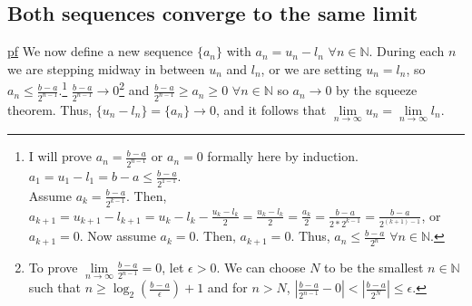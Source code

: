 \documentclass[11pt]{article} %
\begin{document}
	\subsection{Both sequences converge to the same limit}
	\underline{pf} We now define a new sequence $\{ a_n \}$ with $a_n = u_n - l_n$ $\forall n \in \mathbb{N}$. During each $n$ we are stepping midway in between $u_n$ and $l_n$, or we are setting $u_n = l_n$, so $a_n \leq \frac{b - a}{2^{n-1}}$.\footnote{I will prove $a_n = \frac{b-a}{2^{n-1}}$ or $a_n = 0$ formally here by induction.  $a_1 = u_1 - l_1 = b - a \leq \frac{b-a}{2^{1-1}}$. \\ Assume $a_k = \frac{b-a}{2^{k-1}}$. Then, $a_{k+1} = u_{k+1} - l_{k+1} = u_k - l_k - \frac{u_k - l_k}{2} = \frac{u_k - l_k}{2} = \frac{a_k}{2} = \frac{b-a}{2*2^{k-1}} = \frac{b-a}{2^{(k+1)-1}}$, or $a_{k+1} = 0$. Now assume $a_k = 0$. Then, $a_{k+1} = 0$. Thus, $a_n \leq \frac{b-a}{2^n}$ $\forall n \in \mathbb{N}$.}  $ \frac{b - a}{2^{n-1}} \rightarrow 0$\footnote{To prove $\lim\limits_{n \rightarrow \infty}\frac{b-a}{2^{n-1}} = 0$, let $\epsilon > 0$. We can choose $N$ to be the smallest $n \in \mathbb{N}$ such that $n \geq \log_{2} \left( \frac{b-a}{\epsilon}\right)+1$ and for $n>N$, $|\frac{b-a}{2^{n - 1}} - 0 | < |\frac{b-a}{2^{N}}| \leq \epsilon$. } and $\frac{b - a}{2^{n-1}} \geq a_n \geq 0$ $\forall n \in \mathbb{N}$ so $a_n \rightarrow 0$ by the squeeze theorem. Thus, $\{ u_n - l_n \} = \{a_n \} \rightarrow 0$, and it follows that $\lim\limits_{n \rightarrow \infty}u_n = \lim\limits_{n \rightarrow \infty}l_n $.
	
\end{document}
